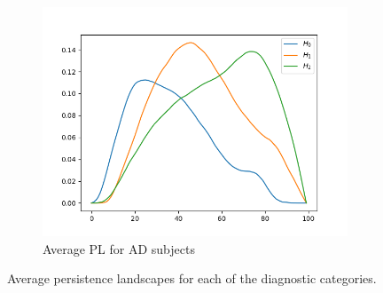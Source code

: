 \documentclass{article}
\begin{document}
\begin{figure}
\begin{subfigure}{0.3\textwidth}
    \includegraphics[width=\textwidth]{figures/average_pls/average_pl_AD.png}
    \caption{Average PL for AD subjects}
  \end{subfigure}
  \caption{Average persistence landscapes for each of the diagnostic categories.}
  \label{fig:average_pls}
\end{figure}
\end{document}
